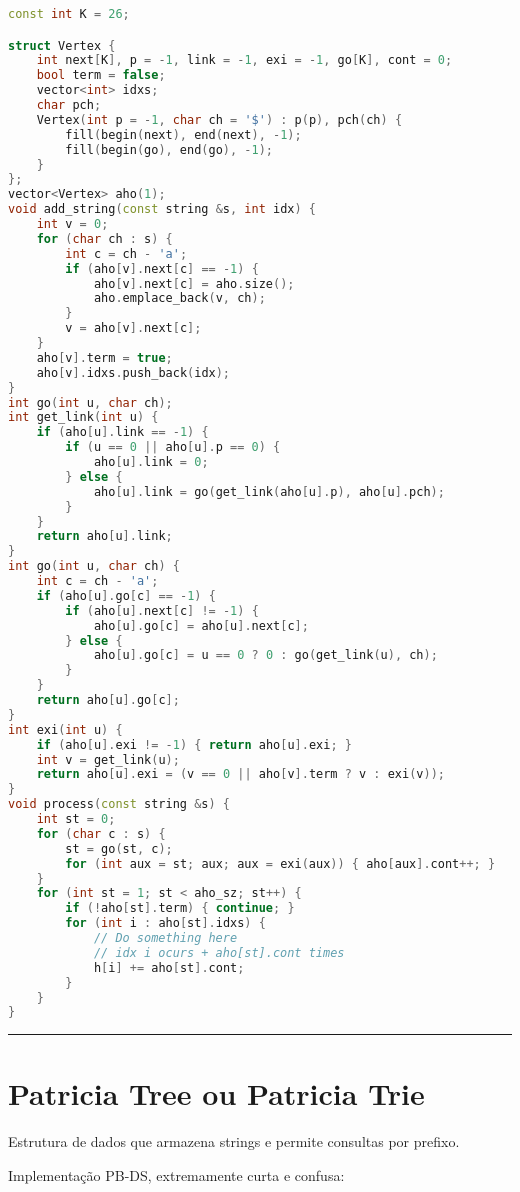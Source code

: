 \documentclass[11pt, a4paper, twoside]{book}
\begin{document}
\hfill

\begin{lstlisting}[language=C++]
const int K = 26;

struct Vertex {
    int next[K], p = -1, link = -1, exi = -1, go[K], cont = 0;
    bool term = false;
    vector<int> idxs;
    char pch;
    Vertex(int p = -1, char ch = '$') : p(p), pch(ch) {
        fill(begin(next), end(next), -1);
        fill(begin(go), end(go), -1);
    }
};
vector<Vertex> aho(1);
void add_string(const string &s, int idx) {
    int v = 0;
    for (char ch : s) {
        int c = ch - 'a';
        if (aho[v].next[c] == -1) {
            aho[v].next[c] = aho.size();
            aho.emplace_back(v, ch);
        }
        v = aho[v].next[c];
    }
    aho[v].term = true;
    aho[v].idxs.push_back(idx);
}
int go(int u, char ch);
int get_link(int u) {
    if (aho[u].link == -1) {
        if (u == 0 || aho[u].p == 0) {
            aho[u].link = 0;
        } else {
            aho[u].link = go(get_link(aho[u].p), aho[u].pch);
        }
    }
    return aho[u].link;
}
int go(int u, char ch) {
    int c = ch - 'a';
    if (aho[u].go[c] == -1) {
        if (aho[u].next[c] != -1) {
            aho[u].go[c] = aho[u].next[c];
        } else {
            aho[u].go[c] = u == 0 ? 0 : go(get_link(u), ch);
        }
    }
    return aho[u].go[c];
}
int exi(int u) {
    if (aho[u].exi != -1) { return aho[u].exi; }
    int v = get_link(u);
    return aho[u].exi = (v == 0 || aho[v].term ? v : exi(v));
}
void process(const string &s) {
    int st = 0;
    for (char c : s) {
        st = go(st, c);
        for (int aux = st; aux; aux = exi(aux)) { aho[aux].cont++; }
    }
    for (int st = 1; st < aho_sz; st++) {
        if (!aho[st].term) { continue; }
        for (int i : aho[st].idxs) {
            // Do something here
            // idx i ocurs + aho[st].cont times
            h[i] += aho[st].cont;
        }
    }
}
\end{lstlisting}

\hfill

\rule{\textwidth}{0.4pt}

\section{Patricia Tree ou Patricia Trie}



Estrutura de dados que armazena strings e permite consultas por prefixo.



Implementação PB-DS, extremamente curta e confusa:
\end{document}
